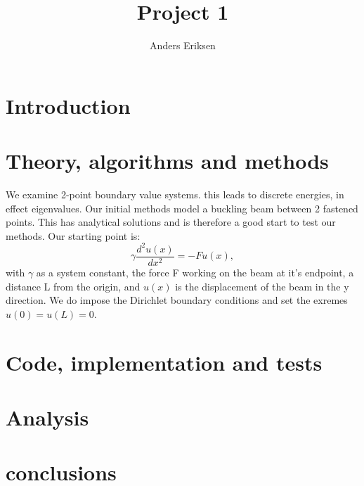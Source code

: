 \documentclass[10pt, twocolumn]{revtex4-1}
\begin{document}
\title{Project 1}
\author{Anders Eriksen}
\begin{abstract}

\end{abstract}
\maketitle

\section{Introduction}

\section{Theory, algorithms and methods}
We examine  2-point boundary value systems. this leads to discrete energies, in effect eigenvalues. Our initial methods model a buckling beam between 2 fastened points. This has analytical solutions and is therefore a good start to test our methods. Our starting point is:
\[
\gamma \frac{d^2 u(x)}{dx^2} = -F u(x),
\]
with $\gamma$ as a system constant, the force F working on the beam at it's endpoint, a distance L from the origin, and $u(x)$ is the displacement of the beam in the y direction. We do impose the Dirichlet boundary conditions and set the exremes $u(0) = u(L) = 0$. 

\section{Code, implementation and tests}

\section{Analysis}


\section{conclusions}
\end{document}
